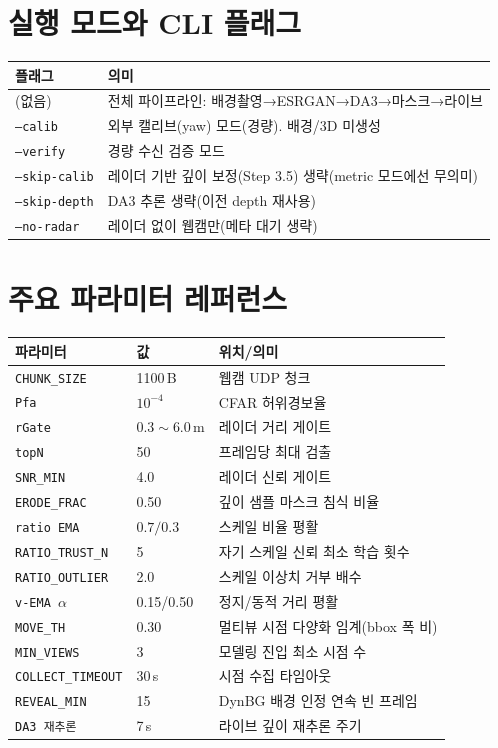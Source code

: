 \chapter{실행 모드와 CLI 플래그}
\begin{center}
\begin{tabular}{@{}lp{8.5cm}@{}}
\toprule
플래그 & 의미 \\
\midrule
(없음)          & 전체 파이프라인: 배경촬영→ESRGAN→DA3→마스크→라이브 \\
\texttt{--calib} & 외부 캘리브(yaw) 모드(경량). 배경/3D 미생성 \\
\texttt{--verify}& 경량 수신 검증 모드 \\
\texttt{--skip-calib} & 레이더 기반 깊이 보정(Step 3.5) 생략(metric 모드에선 무의미) \\
\texttt{--skip-depth} & DA3 추론 생략(이전 depth 재사용) \\
\texttt{--no-radar}   & 레이더 없이 웹캠만(메타 대기 생략) \\
\bottomrule
\end{tabular}
\end{center}

\chapter{주요 파라미터 레퍼런스}
\begin{center}
\begin{tabular}{@{}lll@{}}
\toprule
파라미터 & 값 & 위치/의미 \\
\midrule
\texttt{CHUNK\_SIZE}   & 1100\,B & 웹캠 UDP 청크 \\
\texttt{Pfa}           & $10^{-4}$ & CFAR 허위경보율 \\
\texttt{rGate}         & $0.3\sim6.0$\,m & 레이더 거리 게이트 \\
\texttt{topN}          & 50 & 프레임당 최대 검출 \\
\texttt{SNR\_MIN}      & 4.0 & 레이더 신뢰 게이트 \\
\texttt{ERODE\_FRAC}   & 0.50 & 깊이 샘플 마스크 침식 비율 \\
\texttt{ratio EMA}     & $0.7/0.3$ & 스케일 비율 평활 \\
\texttt{RATIO\_TRUST\_N} & 5 & 자기 스케일 신뢰 최소 학습 횟수 \\
\texttt{RATIO\_OUTLIER}  & 2.0 & 스케일 이상치 거부 배수 \\
\texttt{v-EMA }$\alpha$ & 0.15/0.50 & 정지/동적 거리 평활 \\
\texttt{MOVE\_TH}      & 0.30 & 멀티뷰 시점 다양화 임계(bbox 폭 비) \\
\texttt{MIN\_VIEWS}    & 3 & 모델링 진입 최소 시점 수 \\
\texttt{COLLECT\_TIMEOUT} & 30\,s & 시점 수집 타임아웃 \\
\texttt{REVEAL\_MIN}   & 15 & DynBG 배경 인정 연속 빈 프레임 \\
\texttt{DA3 재추론}    & 7\,s & 라이브 깊이 재추론 주기 \\
\bottomrule
\end{tabular}
\end{center}
